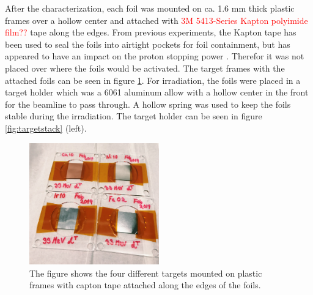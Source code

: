 \noindent 
After the characterization, each foil was mounted on ca. 1.6 mm thick plastic frames over a hollow center and attached with \textcolor{red}{3M 5413-Series Kapton polyimide film??} tape along the edges. From previous experiments, the Kapton tape has been used to seal the foils into airtight pockets for foil containment, but has appeared to have an impact on the proton stopping power \cite{Voyles2019}. Therefor it was not placed over where the foils would be activated. The target frames with the attached foils can be seen in figure \ref{fig:targets_on_frame}. For irradiation, the foils were placed in a target holder which was a 6061 aluminum allow with a hollow center in the front for the beamline to pass through. A hollow spring was used to keep the foils stable during the irradiation. The target holder can be seen in figure \ref{fig:targetstack} (left).    

\begin{figure}
    \centering
    \includegraphics[width=0.5\textwidth]{Experiment/targets_on_frame.JPG}
    \caption{The figure shows the four different targets mounted on plastic frames with capton tape attached along the edges of the foils.}
    \label{fig:targets_on_frame}
\end{figure}


